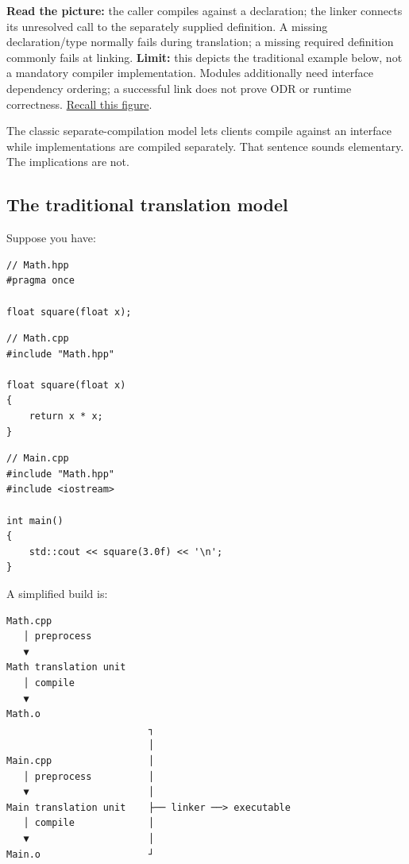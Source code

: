 \hypertarget{01-foundations-i-ch002-figure-cpp-01---two-build-lanes-meet-at-the-linker}{}


\textbf{Read the picture:} the caller compiles against a declaration; the linker connects its unresolved call to the separately supplied definition. A missing declaration/type normally fails during translation; a missing required definition commonly fails at linking. \textbf{Limit:} this depicts the traditional example below, not a mandatory compiler implementation. Modules additionally need interface dependency ordering; a successful link does not prove ODR or runtime correctness. \hyperref[appendix-960160274237-four-figure-briefs]{Recall this figure}.

The classic separate-compilation model lets clients compile against an interface while implementations are compiled separately. That sentence sounds elementary. The implications are not.

\subsection{The traditional translation model}\label{01-foundations-i-ch002-the-traditional-translation-model}

\hypertarget{01-foundations-i-ch002-the-traditional-translation-model}{}

Suppose you have:

\begin{verbatim}
// Math.hpp
#pragma once

float square(float x);
\end{verbatim}

\begin{verbatim}
// Math.cpp
#include "Math.hpp"

float square(float x)
{
    return x * x;
}
\end{verbatim}

\begin{verbatim}
// Main.cpp
#include "Math.hpp"
#include <iostream>

int main()
{
    std::cout << square(3.0f) << '\n';
}
\end{verbatim}

A simplified build is:

\begin{verbatim}
Math.cpp
   │ preprocess
   ▼
Math translation unit
   │ compile
   ▼
Math.o
                         ┐
                         │
Main.cpp                 │
   │ preprocess          │
   ▼                     │
Main translation unit    ├── linker ──> executable
   │ compile             │
   ▼                     │
Main.o                   ┘
\end{verbatim}

